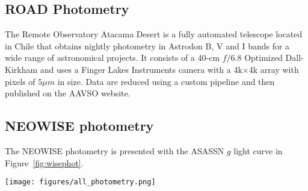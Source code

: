 \documentclass{aa}
\begin{document}

%
%
%
%

\subsection{ROAD Photometry}

The Remote Observatory Atacama Desert \citep[ROAD; ][]{Hambsch12} is a fully automated telescope located in Chile that obtains nightly photometry in Astrodon B, V and I bands for a wide range of astronomical projects.
%
It consists of a 40-cm $f/6.8$ Optimized Dall-Kirkham and uses a Finger Lakes Instruments camera with a 4k$\times$4k array with pixels of $5\mu m$ in size.
%
Data are reduced using a custom pipeline and then published on the AAVSO website.

\subsection{NEOWISE photometry}

The NEOWISE photometry is presented with the ASASSN $g$ light curve in Figure~\ref{fig:wisephot}.

\begin{figure*}
\begin{centering}
\texttt{[image: figures/all\_photometry.png]}
\caption{NEOWISE $W1$ and $W2$ photometry of the star, with the WISE color in the lowest panel.
%
The $NEOWISE$ color changes from colourless to very red, which now fades back towards colourless over $\sim 500$ days.
}
\label{fig:wisephot}
\end{centering}
\end{figure*}
\end{document}
